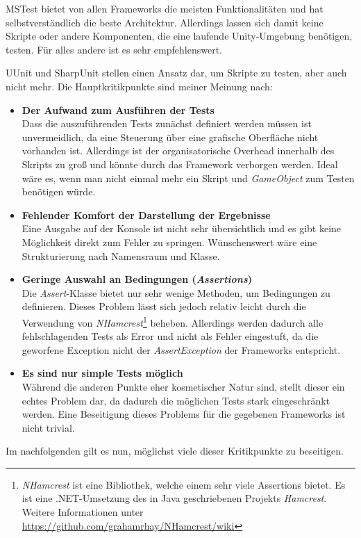 MSTest bietet von allen Frameworks die meisten Funktionalitäten und hat selbstverständlich die beste Architektur. Allerdings lassen sich damit keine Skripte oder andere Komponenten, die eine laufende Unity-Umgebung benötigen, testen. Für alles andere ist es sehr empfehlenswert.

UUnit und SharpUnit stellen einen Ansatz dar, um Skripte zu testen, aber auch nicht mehr. Die Hauptkritikpunkte sind meiner Meinung nach:
\begin{itemize}
\item \textbf{Der Aufwand zum Ausführen der Tests}\\
Dass die auszuführenden Tests zunächst definiert werden müssen ist unvermeidlich, da eine Steuerung über eine grafische Oberfläche nicht vorhanden ist. Allerdings ist der organisatorische Overhead innerhalb des Skripts zu groß und könnte durch das Framework verborgen werden. Ideal wäre es, wenn man nicht einmal mehr ein Skript und \textit{GameObject} zum Testen benötigen würde.
\item \textbf{Fehlender Komfort der Darstellung der Ergebnisse}\\
Eine Ausgabe auf der Konsole ist nicht sehr übersichtlich und es gibt keine Möglichkeit direkt zum Fehler zu springen. Wünschenswert wäre eine Strukturierung nach Namensraum und Klasse.
\item \textbf{Geringe Auswahl an Bedingungen (\textit{Assertions})}\\
Die \textit{Assert}-Klasse bietet nur sehr wenige Methoden, um Bedingungen zu definieren. Dieses Problem lässt sich jedoch relativ leicht durch die Verwendung von \textit{NHamcrest}\footnote{\textit{NHamcrest} ist eine Bibliothek, welche einem sehr viele Assertions bietet. Es ist eine .NET-Umsetzung des in Java geschriebenen Projekts \textit{Hamcrest}. Weitere Informationen unter \url{https://github.com/grahamrhay/NHamcrest/wiki}} beheben. Allerdings werden dadurch alle fehlschlagenden Tests als Error und nicht als Fehler eingestuft, da die geworfene Exception nicht der \textit{AssertException} der Frameworks entspricht.
\item \textbf{Es sind nur simple Tests möglich}\\
Während die anderen Punkte eher kosmetischer Natur sind, stellt dieser ein echtes Problem dar, da dadurch die möglichen Tests stark eingeschränkt werden. Eine Beseitigung dieses Problems für die gegebenen Frameworks ist nicht trivial.
\end{itemize}

Im nachfolgenden gilt es nun, möglichst viele dieser Kritikpunkte zu beseitigen.